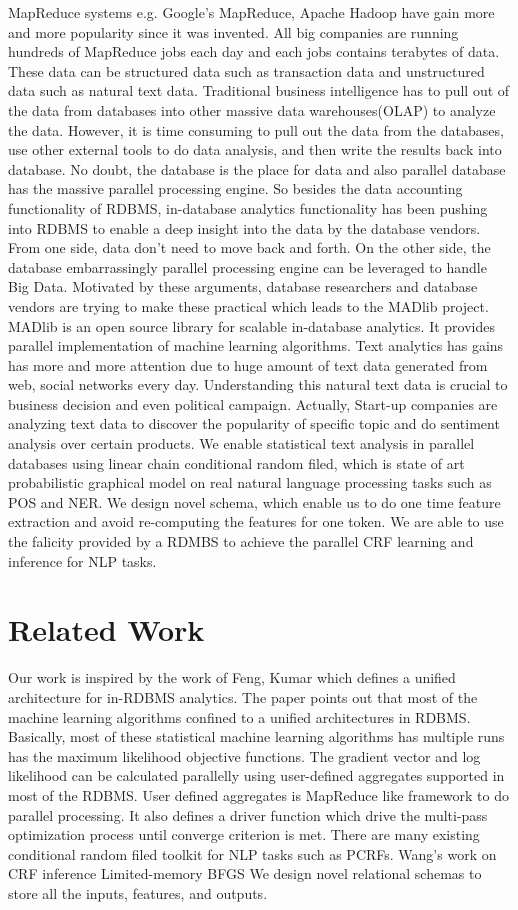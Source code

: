 \documentclass[11pt,letterpaper]{article}
\begin{document}
MapReduce systems e.g. Google's MapReduce, Apache Hadoop have gain more and more popularity since it was invented. All big companies are running hundreds of MapReduce jobs each day and each jobs contains terabytes of data.  These data can be structured data such as transaction data and unstructured data such as natural text data. 
Traditional business intelligence has to pull out of the data from databases into other massive data warehouses(OLAP) to analyze the data. 
However, it is time consuming to pull out the data from the databases, use other external tools to do data analysis, and then write the results back into database.
No doubt, the database is the place for data and also parallel database has the massive parallel processing engine. 
So besides the data accounting functionality of RDBMS, in-database analytics functionality has been pushing into RDBMS to enable a deep insight into the data by the database vendors.  From one side, data don’t need to move back and forth.
On the other side, the database embarrassingly parallel processing engine can be leveraged to handle Big Data. 
Motivated by these arguments, database researchers and database vendors are trying to make these practical which leads to the MADlib project. MADlib is an open source library for scalable in-database analytics. It provides parallel implementation of machine learning algorithms.
Text analytics has gains has more and more attention due to huge amount of text data generated from web, social networks every day.
Understanding this natural text data is crucial to business decision and even political campaign. 
Actually, Start-up companies are analyzing text data to discover the popularity of specific topic and do sentiment analysis over certain products. We enable statistical text analysis in parallel databases using linear chain conditional random filed, which is state of art probabilistic graphical model on real natural language processing tasks such as POS and NER.  We design novel schema, which enable us to do one time feature extraction and avoid re-computing the features for one token. We are able to use the falicity provided by a RDMBS to achieve the parallel CRF learning and inference for NLP tasks.

\section{Related Work}
Our work is inspired by the work of Feng, Kumar which defines a unified architecture for in-RDBMS analytics.
The paper points out that most of the machine learning algorithms confined to a unified architectures in RDBMS.
Basically, most of these statistical machine learning algorithms has multiple runs has the maximum likelihood objective functions. The gradient vector and log likelihood can be calculated parallelly using user-defined aggregates supported in most of the RDBMS. User defined aggregates is MapReduce like framework to do parallel processing.
It also defines a driver function which drive the multi-pass optimization process until converge criterion is met.
There are many existing conditional random filed toolkit for NLP tasks such as PCRFs. Wang's work on CRF inference Limited-memory BFGS We design novel relational schemas to store all the inputs, features, and outputs.
\end{document}
